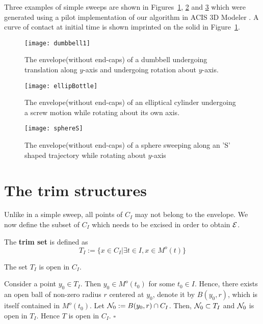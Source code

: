 \documentclass{elsart5p}
\begin{document}
Three examples of simple sweeps are shown in Figures~\ref{dumbbellFig}, \ref{ellipBottleFig} 
and \ref{sphereSFig} which 
were generated using a pilot implementation of our algorithm in ACIS 3D Modeler \cite{acis}.
A curve of contact at initial time is shown imprinted on the solid in Figure~\ref{dumbbellFig}.

\begin{figure}
 \centering
 \texttt{[image: dumbbell1]}
 \caption{The envelope(without end-caps) of a dumbbell undergoing translation along $y$-axis and undergoing rotation about $y$-axis.}
 \label{dumbbellFig}
\end{figure}

\begin{figure}
 \centering
 \texttt{[image: ellipBottle]}
 \caption{The envelope(without end-caps) of an elliptical cylinder undergoing a screw motion while rotating about 
its own axis.}
 \label{ellipBottleFig}
\end{figure}
\begin{figure}
 \centering
 \texttt{[image: sphereS]}
 \caption{The envelope(without end-caps) of a sphere sweeping along an 'S' shaped trajectory while rotating 
about $y$-axis}
 \label{sphereSFig}
\end{figure}
\section{The trim structures}	\label{simpleSISec}

Unlike in a simple sweep, all points of $C_I$ may not belong to the envelope.  We now define the 
subset of $C_I$ which needs to be excised in order to obtain ${\cal E}$.
\begin{defn} \label{trimSetDef}
The {\bf trim set} is defined as 
$$T_I:=\{ x \in C_I |\exists t \in I, x \in M^o(t) \}$$ 
\end{defn}

\begin{lem} \label{trimSetLem}
The set $T_I$ is open in $C_I$.
\end{lem}
  Consider a point $y_0 \in T_I$.  Then $y_0 \in M^o(t_0)$ for some $t_0 \in I$.  
Hence, there exists an open ball of non-zero radius $r$ 
centered at $y_0$, denote it by $B(y_0, r)$, which is itself contained in $M^o(t_0)$.  
Let ${\cal N}_0 := B(y_0, r) \cap C_I$.
Then, ${\cal N}_0 \subset T_I$ and  ${\cal N}_0$ is open in $T_I$. Hence $T$ is open in $C_I$.
\hfill $\square$
\end{document}

